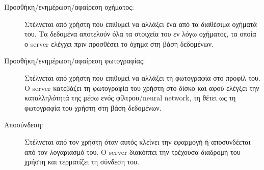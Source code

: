 \documentclass[../thesis.tex]{subfiles}
\begin{document}
\begin{description}
    \item[Προσθήκη/ενημέρωση/αφαίρεση οχήματος:] Στέλνεται από χρήστη που επιθυμεί να αλλάξει ένα από τα διαθέσιμα οχήματά του. Τα δεδομένα αποτελούν όλα τα στοιχεία του εν λόγω οχήματος, τα οποία ο server ελέγχει πριν προσθέσει το όχημα στη βάση δεδομένων.
    \item[Προσθήκη/ενημέρωση/αφαίρεση φωτογραφίας:] Στέλνεται από χρήστη που επιθυμεί να αλλάξει τη φωτογραφία στο προφίλ του. Ο server κατεβάζει τη φωτογραφία του χρήστη στο δίσκο και αφού ελέγξει την καταλληλότητά της μέσω ενός φίλτρου/neural network, τη θέτει ως τη φωτογραφία του χρήστη στη βάση δεδομένων.
    \item[Αποσύνδεση:] Στέλνεται από τον χρήστη όταν αυτός κλείνει την εφαρμογή ή αποσυνδέεται από τον λογαριασμό του. Ο server διακόπτει την τρέχουσα διαδρομή του χρήστη και τερματίζει τη σύνδεση του.
\end{description}
\end{document}

